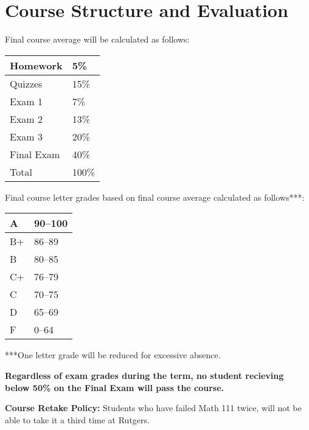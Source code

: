 \documentclass{article}
\begin{document}
\section*{Course Structure and Evaluation}

Final course average will be calculated as follows: \par
\begin{center}
    \begin{tabular}{|l|l|}
        \hline
        Homework & 5\% \\
        \hline
        Quizzes & 15\% \\
        \hline
        Exam 1 & 7\% \\
        \hline
        Exam 2 & 13\% \\
        \hline
        Exam 3 & 20\% \\
        \hline
        Final Exam & 40\% \\
        \hline
        Total & 100\% \\
        \hline
    \end{tabular}
\end{center}
Final course letter grades based on final course average calculated as follows***:
\begin{center}
    \begin{tabular}{|l|l|}
        \hline
        A & 90--100 \\
        \hline
        B+ & 86--89 \\
        \hline
        B & 80--85 \\
        \hline
        C+ & 76--79 \\
        \hline
        C & 70--75 \\
        \hline
        D & 65--69 \\
        \hline
        F & 0--64 \\
        \hline
    \end{tabular}
\end{center}
***One letter grade will be reduced for excessive absence. \par
\hfill \par
\noindent \textbf{Regardless of exam grades during the term, no student recieving below 50\% on the Final Exam will pass the course.} \par
\hfill \par
\noindent \textbf{Course Retake Policy:} Students who have failed Math 111 twice, will not be able to take it a third time at Rutgers. \par
\hfill \par
\end{document}
